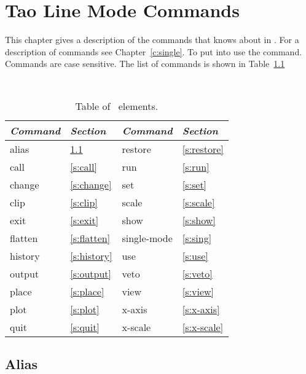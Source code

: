 \chapter{Tao Line Mode Commands}
\label{c:commands}

This chapter gives a description of the commands that \tao knows about
in . For a description of  commands
see Chapter~\ref{c:single}. To put \tao into  use the
 command.
Commands are case sensitive. The list of commands 
is shown in Table~\ref{t:commands}

\begin{table}[h]
\centering
{\tt
\begin{tabular}{|l|l||l|l|} \hline
  {\it Command} & {\it Section}  & {\it Command} & {\it Section} \\ \hline
  alias    & \ref{s:alias}    &  restore     & \ref{s:restore} \\ \hline
  call     & \ref{s:call}     &  run         & \ref{s:run}     \\ \hline
  change   & \ref{s:change}   &  set         & \ref{s:set}     \\ \hline
  clip     & \ref{s:clip}     &  scale       & \ref{s:scale}   \\ \hline
  exit     & \ref{s:exit}     &  show        & \ref{s:show}    \\ \hline
  flatten  & \ref{s:flatten}  &  single-mode & \ref{s:sing}    \\ \hline
  history  & \ref{s:history}  &  use         & \ref{s:use}     \\ \hline
  output   & \ref{s:output}   &  veto        & \ref{s:veto}    \\ \hline
  place    & \ref{s:place}    &  view        & \ref{s:view}    \\ \hline
  plot     & \ref{s:plot}     &  x-axis      & \ref{s:x-axis}  \\ \hline
  quit     & \ref{s:quit}     &  x-scale     & \ref{s:x-scale} \\ \hline
\end{tabular}
}
\caption{Table of \bmad\ elements.}
\label{t:commands}
\end{table}

\vfil
\break

\section{Alias}
\label{s:alias}

